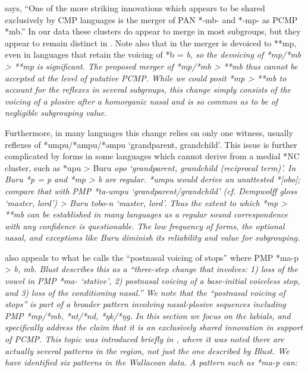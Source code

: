 \citet[26]{Blust1981} says,
“One of the more striking innovations which appears to be shared
exclusively by CMP languages is the merger of PAN *-mb-
and *-mp- as PCMP *mb.” In our data these clusters do appear
to merge in most subgroups,
but they appear to remain distinct in .
Note also that in  the merger is devoiced to
**mp, even in languages that retain the voicing of *b = \it{b},
so the devoicing of *mp/*mb > **mp is significant.
The proposed merger of *mp/*mb > **mb thus cannot be accepted
at the level of putative PCMP.
While we could posit *mp > **mb to account for the reflexes in
several subgroups, this change simply consists of the voicing of a plosive after
a homorganic nasal and is so common as to be of negligible subgrouping value.

Furthermore, in many languages this change relies on only one
witness, usually reflexes of *umpu/*ampu/*əmpu ‘grandparent, grandchild’.
This issue is further complicated by forms in some languages
which cannot derive from a medial *NC cluster,
such as *upu > Buru \it{opo} ‘grandparent, grandchild (reciprocal term)’.
In Buru *p = \it{p}
and *mp > \it{b} are regular.
*umpu would derive an unattested *[obo]; compare that with PMP *ta-umpu ‘grandparent/grandchild’ (cf.
Dempwolff gloss ‘master, lord’) > Buru \it{tobo-n} ‘master, lord’.
Thus the extent to which *mp > **mb can be established in many
languages as a regular sound correspondence with any confidence is questionable.
The low frequency of forms,
the optional nasal, and exceptions like Buru diminish its reliability
and value for subgrouping.

\citet[72]{Blust2009} also appeals to what he calls the “postnasal
voicing of stops” where PMP *ma-p > \it{b, mb}.
Blust describes this as a “three-step change that involves: 1)
loss of the vowel in PMP *ma- ‘stative’,
2) postnasal voicing of a base-initial voiceless stop,
and 3) loss of the conditioning nasal.” We note that the “postnasal
voicing of stops” is part of a broader pattern involving nasal-plosive
sequences including PMP *mp/*mb, *nt/*nd, *ŋk/*ŋg.
In this section we focus on the labials,
and specifically address the claim that it is an exclusively
shared innovation in support of PCMP.
This topic was introduced briefly in ,
where it was noted there are actually several patterns in the
region, not just the one described by Blust.
We have identified six patterns in the Wallacean data.
A pattern such as *ma-p can:

